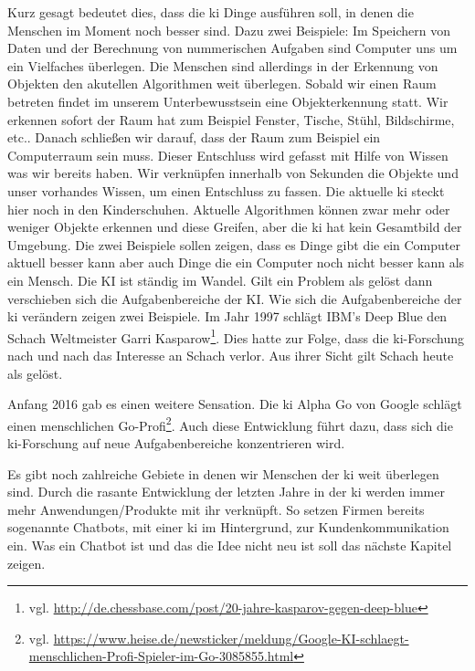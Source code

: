 Kurz gesagt bedeutet dies, dass die \ac{ki} Dinge ausführen soll, in denen die Menschen im Moment noch besser sind. Dazu zwei Beispiele: \newline
Im Speichern von Daten und der Berechnung von nummerischen Aufgaben sind Computer uns um ein Vielfaches überlegen. \newline
 Die Menschen sind allerdings in der Erkennung von Objekten den akutellen Algorithmen weit überlegen. Sobald wir einen Raum betreten findet im unserem Unterbewusstsein eine Objekterkennung statt. Wir erkennen sofort der Raum hat zum Beispiel Fenster, Tische, Stühl, Bildschirme, etc.. Danach schließen wir darauf, dass der Raum zum Beispiel ein Computerraum sein muss. Dieser Entschluss wird gefasst mit Hilfe von Wissen was wir bereits haben. Wir verknüpfen innerhalb von Sekunden die Objekte und unser vorhandes Wissen, um einen Entschluss zu fassen. Die aktuelle \ac{ki} steckt hier noch in den Kinderschuhen. Aktuelle Algorithmen können zwar mehr oder weniger Objekte erkennen und diese Greifen, aber die \ac{ki} hat kein Gesamtbild der Umgebung. Die zwei Beispiele sollen zeigen, dass es Dinge gibt die ein Computer aktuell besser kann aber auch Dinge die ein Computer noch nicht besser kann als ein Mensch. Die KI ist ständig im Wandel. Gilt ein Problem als gelöst dann verschieben sich die Aufgabenbereiche der KI.   
Wie sich die Aufgabenbereiche der \ac{ki} verändern zeigen zwei Beispiele. Im Jahr 1997 schlägt IBM's Deep Blue den Schach Weltmeister Garri Kasparow\footnote{vgl. \url{http://de.chessbase.com/post/20-jahre-kasparov-gegen-deep-blue}}. Dies hatte zur Folge, dass die \ac{ki}-Forschung nach und nach das Interesse an Schach verlor. Aus ihrer Sicht gilt Schach heute als gelöst. 

Anfang 2016 gab es einen weitere Sensation. Die \ac{ki} Alpha Go von Google schlägt einen menschlichen Go-Profi\footnote{vgl. \url{https://www.heise.de/newsticker/meldung/Google-KI-schlaegt-menschlichen-Profi-Spieler-im-Go-3085855.html}}. Auch diese Entwicklung führt dazu, dass sich die \ac{ki}-Forschung auf neue Aufgabenbereiche konzentrieren wird. 

Es gibt noch zahlreiche Gebiete in denen wir Menschen der \ac{ki} weit überlegen sind. Durch die rasante Entwicklung der letzten Jahre in der \ac{ki} werden immer mehr Anwendungen/Produkte mit ihr verknüpft. So setzen Firmen bereits sogenannte Chatbots, mit einer \ac{ki} im Hintergrund, zur Kundenkommunikation ein. Was ein Chatbot ist und das die Idee nicht neu ist soll das nächste Kapitel zeigen. 

